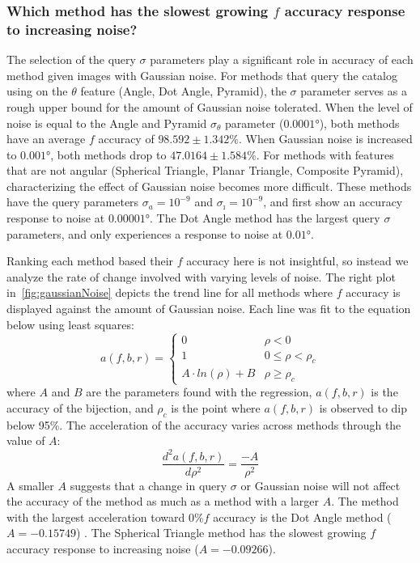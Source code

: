 \subsubsection{Which method has the slowest growing $f$ accuracy response to increasing noise?}
The selection of the query $\sigma$ parameters play a significant role in accuracy of each method given images with
Gaussian noise.
For methods that query the catalog using on the $\theta$ feature (Angle, Dot Angle, Pyramid), the $\sigma$ parameter
serves as a rough upper bound for the amount of Gaussian noise tolerated.
When the level of noise is equal to the Angle and Pyramid $\sigma_\theta$ parameter ($\ang{0.0001}$),
both methods have an average $f$ accuracy of $98.592 \pm 1.342\%$.
When Gaussian noise is increased to $\ang{0.001}$, both methods drop to $47.0164 \pm 1.584\%$.
For methods with features that are not angular (Spherical Triangle, Planar Triangle, Composite Pyramid),
characterizing the effect of Gaussian noise becomes more difficult.
These methods have the query parameters $\sigma_a = 10^{-9}$ and $\sigma_\imath = 10^{-9}$, and first show an
accuracy response to noise at $\ang{0.00001}$.
The Dot Angle method has the largest query $\sigma$ parameters, and only experiences a response to noise at
$\ang{0.01}$.

Ranking each method based their $f$ accuracy here is not insightful, so instead we analyze the rate of change involved
with varying levels of noise.
The right plot in~\autoref{fig:gaussianNoise} depicts the trend line for all methods where $f$ accuracy is displayed
against the amount of Gaussian noise.
Each line was fit to the equation below using least squares:
\begin{equation}
    a(f, b, r) =
    \begin{cases}
        0 & \rho < 0 \\
        1 & 0 \leq \rho < \rho_c \\
        A \cdot \mathit{ln}(\rho) + B & \rho \geq \rho_c
    \end{cases}
\end{equation}
where $A$ and $B$ are the parameters found with the regression, $a(f, b, r)$ is the accuracy of the bijection, and
$\rho_c$ is the point where $a(f, b, r)$ is observed to dip below 95\%.
The acceleration of the accuracy varies across methods through the value of $A$:
\begin{equation}
    \frac{d^{2}a(f, b, r)}{d\rho^2} = \frac{-A}{\rho^2}
\end{equation}
A smaller $A$ suggests that a change in query $\sigma$ or Gaussian noise will not affect the accuracy of the method
as much as a method with a larger $A$.
The method with the largest acceleration toward $0\% f$ accuracy is the Dot Angle method ($A = -0.15749$) .
The Spherical Triangle method has the slowest growing $f$ accuracy response to increasing noise ($A = -0.09266$).

